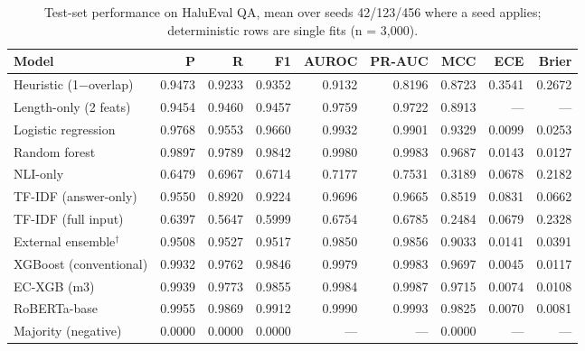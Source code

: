 \documentclass[a4paper,fleqn]{cas-sc}
\begin{document}
\begin{table}[pos=htbp]
  \centering
  \caption{Test-set performance on HaluEval QA, mean over seeds 42/123/456 where a seed applies; deterministic rows are single fits (n = 3{,}000).}
  \label{tab:models}
  \begin{tabular}{lrrrrrrrr}
    \toprule
    \textbf{Model}          & \textbf{P} & \textbf{R} & \textbf{F1} & \textbf{AUROC} & \textbf{PR-AUC} & \textbf{MCC} & \textbf{ECE} & \textbf{Brier} \\
    \midrule
    Heuristic (1$-$overlap) & 0.9473     & 0.9233     & 0.9352      & 0.9132         & 0.8196          & 0.8723       & 0.3541       & 0.2672         \\
    Length-only (2 feats)   & 0.9454     & 0.9460     & 0.9457      & 0.9759         & 0.9722          & 0.8913       & ---          & ---            \\
    Logistic regression     & 0.9768     & 0.9553     & 0.9660      & 0.9932         & 0.9901          & 0.9329       & 0.0099       & 0.0253         \\
    Random forest           & 0.9897     & 0.9789     & 0.9842      & 0.9980         & 0.9983          & 0.9687       & 0.0143       & 0.0127         \\
    NLI-only                & 0.6479     & 0.6967     & 0.6714      & 0.7177         & 0.7531          & 0.3189       & 0.0678       & 0.2182         \\
    TF-IDF (answer-only)    & 0.9550     & 0.8920     & 0.9224      & 0.9696         & 0.9665          & 0.8519       & 0.0831       & 0.0662         \\
    TF-IDF (full input)     & 0.6397     & 0.5647     & 0.5999      & 0.6754         & 0.6785          & 0.2484       & 0.0679       & 0.2328         \\
    External ensemble$^\dagger$ & 0.9508 & 0.9527     & 0.9517      & 0.9850         & 0.9856          & 0.9033       & 0.0141       & 0.0391         \\
    XGBoost (conventional)  & 0.9932     & 0.9762     & 0.9846      & 0.9979         & 0.9983          & 0.9697       & 0.0045       & 0.0117         \\
    EC-XGB (m3)             & 0.9939     & 0.9773     & 0.9855      & 0.9984         & 0.9987          & 0.9715       & 0.0074       & 0.0108         \\
    RoBERTa-base            & 0.9955     & 0.9869     & 0.9912      & 0.9990         & 0.9993          & 0.9825       & 0.0070       & 0.0081         \\
    Majority (negative)     & 0.0000     & 0.0000     & 0.0000      & ---            & ---             & 0.0000       & ---          & ---            \\
    \bottomrule
  \end{tabular}
\end{table}
\end{document}

